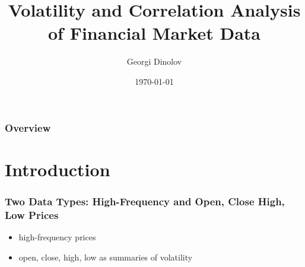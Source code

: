 \documentclass{beamer}
\title[]{Volatility and Correlation Analysis of Financial Market Data} %
\author{Georgi Dinolov} %
\institute[UCSC] %
{
University of California, Santa Cruz \\ %
\medskip
\textit{gdinolov@soe.ucsc.edu} %
}
\date{\today} %
\begin{document}
\begin{frame}
\titlepage %
\end{frame}

\begin{frame}
\frametitle{Overview} %
\tableofcontents %
\end{frame}


\section{Introduction}

\begin{frame}
\frametitle{Two Data Types: High-Frequency and Open, Close High, Low Prices}
\begin{itemize}
  \item high-frequency prices
  \item open, close, high, low as summaries of volatility
\end{itemize}
\end{frame}

\end{document}
